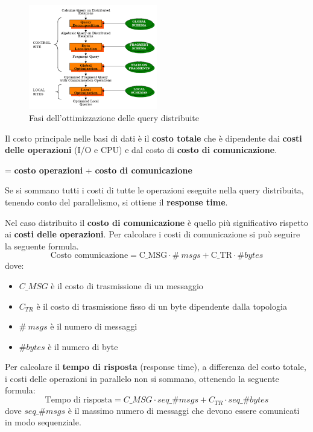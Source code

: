\begin{figure}[!ht]
      \centering
      \includegraphics[width=0.5\textwidth]{./img/DDBMS/query.png}
      \caption{Fasi dell'ottimizzazione delle query distribuite}
      \label{fig:queryOptimization}
\end{figure}

Il costo principale nelle basi di dati è il \textbf{costo totale} che è dipendente
dai \textbf{costi delle operazioni} (I/O e CPU) e dal costo di \textbf{costo di comunicazione}.
\begin{center}
       = \textbf{costo operazioni} + \textbf{costo di comunicazione}
\end{center}
Se si sommano tutti i costi di tutte le operazioni eseguite nella query distribuita,
tenendo conto del parallelismo, si ottiene il \textbf{response time}.

Nel caso distribuito il \textbf{costo di comunicazione} è quello più significativo rispetto
ai \textbf{costi delle operazioni}. Per calcolare i costi di comunicazione si
può seguire la seguente formula.
\begin{equation*}
      \text{Costo comunicazione} = \text{C\_{MSG}} \cdot \#\ msgs  + \text{C\_{TR}} \cdot \#bytes
\end{equation*}
dove:
\begin{itemize}
      \item \textbf{$C\_{MSG}$} è il costo di trasmissione di un messaggio
      \item \textbf{$C_{TR}$} è il costo di trasmissione fisso di un byte
            dipendente dalla topologia
      \item \textbf{$\#\ msgs$} è il numero di messaggi
      \item \textbf{$\#bytes$} è il numero di byte
\end{itemize}
Per calcolare il \textbf{tempo di risposta} (response time), a differenza del
costo totale, i costi delle operazioni in parallelo non si sommano,
ottenendo la seguente formula:
\begin{equation*}
      \text{Tempo di risposta} = C\_{MSG} \cdot seq\_\#msgs + C_{TR} \cdot seq\_\#bytes
\end{equation*}
dove $seq\_\#msgs$ è il massimo numero di messaggi che devono essere comunicati
in modo sequenziale.

